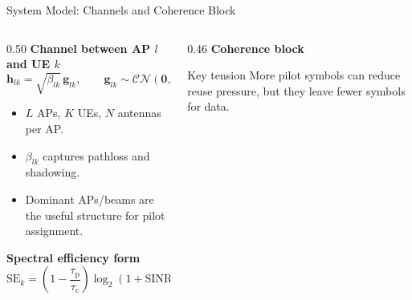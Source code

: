 \documentclass[10pt,aspectratio=169]{beamer}
\newcommand{\taup}{\tau_{\mathrm{p}}}
\newcommand{\tauc}{\tau_{\mathrm{c}}}
\newcommand{\se}{\mathrm{SE}}
\newenvironment{tightitemize}{%
    \begin{itemize}
        \setlength{\itemsep}{1pt}
        \setlength{\parskip}{0pt}
        \setlength{\parsep}{0pt}
}{%
    \end{itemize}
}
\begin{document}
\begin{frame}{System Model: Channels and Coherence Block}
    \small
    \begin{columns}[T,onlytextwidth]
        \begin{column}{0.50\textwidth}
            \textbf{Channel between AP $l$ and UE $k$}
            \[
                \mathbf{h}_{lk} = \sqrt{\beta_{lk}}\,\mathbf{g}_{lk},
                \qquad
                \mathbf{g}_{lk}\sim\mathcal{CN}(\mathbf{0},\mathbf{I}_N)
            \]
            \begin{tightitemize}
                \item $L$ APs, $K$ UEs, $N$ antennas per AP.
                \item $\beta_{lk}$ captures pathloss and shadowing.
                \item Dominant APs/beams are the useful structure for pilot assignment.
            \end{tightitemize}

            \vspace{0.55em}
            \textbf{Spectral efficiency form}
            \[
                \se_k =
                \left(1-\frac{\taup}{\tauc}\right)
                \log_2(1+\mathrm{SINR}_k)
            \]
        \end{column}
        \begin{column}{0.46\textwidth}
            \textbf{Coherence block}
            \vspace{0.4em}
            \begin{center}
            \end{center}

            \vspace{0.6em}
            \begin{block}{Key tension}
                More pilot symbols can reduce reuse pressure, but they leave fewer symbols for data.
            \end{block}
        \end{column}
    \end{columns}
\end{frame}
\end{document}

